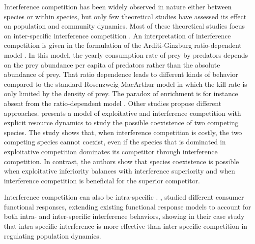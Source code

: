 Interference competition has been widely observed in nature either between
species or within species, but only few theoretical studies have assessed its
effect on population and community dynamics. Most of these theoretical studies
focus on inter-specific interference competition
\autocite{case1974a,carothers1984a,vance1984a,adler2000a}. An interpretation of
interference competition is given in the formulation of the Arditi-Ginzburg
ratio-dependent model \autocite{arditi1989a,arditi1991a,arditi2012a}. In this
model, the yearly consumption rate of prey by predators depends on the prey
abundance per capita of predators rather than the absolute abundance of prey.
That ratio dependence leads to different kinds of behavior compared to the
standard Rosenzweig-MacArthur model in which the kill rate is only limited by
the density of prey. The paradox of enrichment is for instance absent from the
ratio-dependent model \autocite{arditi2012a}. Other studies propose different
approaches. \textcite{amarasekare2002a} presents a model of exploitative and
interference competition with explicit resource dynamics to study the possible
coexistence of two competing species. The study shows that, when interference
competition is costly, the two competing species cannot coexist, even if the
species that is dominated in exploitative competition dominates its competitor
through interference competition. In contrast, the authors show that species
coexistence is possible when exploitative inferiority balances with interference
superiority and when interference competition is beneficial for the superior
competitor.

Interference competition can also be intra-specific
\autocite{walde1984a,crowley1987a,maddonni2004a,smallegange2006a}.
\textcite{de-villemereuil2011a}, studied different consumer functional
responses, extending existing functional response models to account for both
intra- and inter-specific interference behaviors, showing in their case study
that intra-specific interference is more effective than inter-specific
competition in regulating population dynamics.

